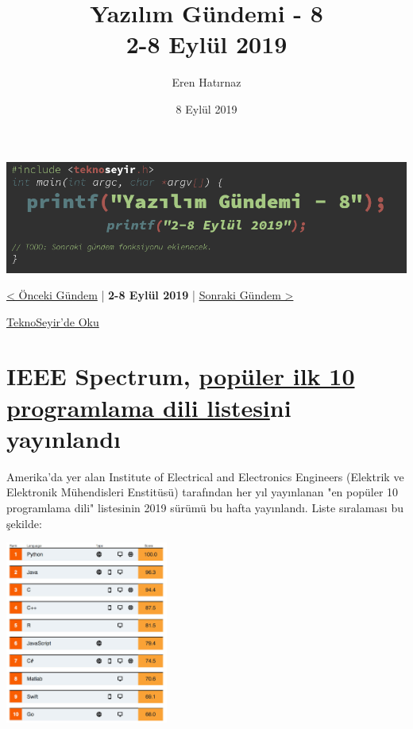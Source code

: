 \documentclass[11pt]{article}
\author{Eren Hatırnaz}
\date{8 Eylül 2019}
\title{Yazılım Gündemi - 8\\\medskip
\large 2-8 Eylül 2019}
\begin{document}
\maketitle
\tableofcontents \clearpage\shorthandoff{=}

\begin{center}
\includegraphics[width=.9\linewidth]{gorseller/yazilim-gundemi-banner.png}
\end{center}

\begin{center}
\href{../07/yazilim-gundemi-07.pdf}{< Önceki Gündem} | \textbf{2-8 Eylül 2019} | \href{../09/yazilim-gundemi-09.pdf}{Sonraki Gündem >}

\href{https://teknoseyir.com/blog/yazilim-gundemi-8-2-8-eylul-2019}{TeknoSeyir'de Oku}
\end{center}

\section{IEEE Spectrum, \href{https://spectrum.ieee.org/computing/software/the-top-programming-languages-2019}{popüler ilk 10 programlama dili listesi}ni yayınlandı}
\label{sec:org7a0d9b7}
Amerika'da yer alan Institute of Electrical and Electronics Engineers
(Elektrik ve Elektronik Mühendisleri Enstitüsü) tarafından her yıl yayınlanan
"en popüler 10 programlama dili" listesinin 2019 sürümü bu hafta yayınlandı.
Liste sıralaması bu şekilde:

\begin{center}
\includegraphics[height=6cm]{gorseller/populer-10-programlama-dili.png}
\end{center}
\end{document}
